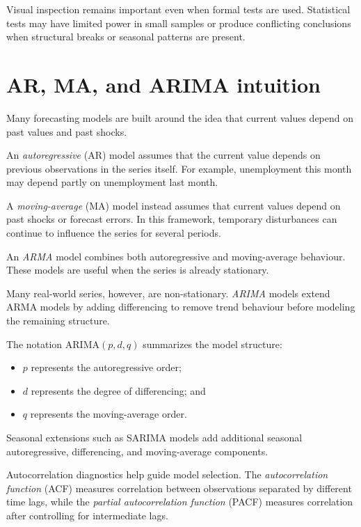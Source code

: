 \documentclass[
  11pt,
  oneside]{book}
\providecommand{\tightlist}{%
  \setlength{\itemsep}{0pt}\setlength{\parskip}{0pt}}
\begin{document}
Visual inspection remains important even when formal tests are used. Statistical tests may have limited power in small samples or produce conflicting conclusions when structural breaks or seasonal patterns are present.

\section{AR, MA, and ARIMA intuition}\label{ar-ma-and-arima-intuition}

Many forecasting models are built around the idea that current values depend on past values and past shocks.

An \emph{autoregressive} (AR) model assumes that the current value depends on previous observations in the series itself. For example, unemployment this month may depend partly on unemployment last month.

A \emph{moving-average} (MA) model instead assumes that current values depend on past shocks or forecast errors. In this framework, temporary disturbances can continue to influence the series for several periods.

An \emph{ARMA} model combines both autoregressive and moving-average behaviour. These models are useful when the series is already stationary.

Many real-world series, however, are non-stationary. \emph{ARIMA} models extend ARMA models by adding differencing to remove trend behaviour before modeling the remaining structure.

The notation ARIMA\((p,d,q)\) summarizes the model structure:

\begin{itemize}
\tightlist
\item
  \(p\) represents the autoregressive order;
\item
  \(d\) represents the degree of differencing; and
\item
  \(q\) represents the moving-average order.
\end{itemize}

Seasonal extensions such as SARIMA models add additional seasonal autoregressive, differencing, and moving-average components.

Autocorrelation diagnostics help guide model selection. The \emph{autocorrelation function} (ACF) measures correlation between observations separated by different time lags, while the \emph{partial autocorrelation function} (PACF) measures correlation after controlling for intermediate lags.
\end{document}
